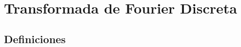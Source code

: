\documentclass[11pt,compress]{beamer}
\begin{document}
	

{
	\begin{frame}[plain]
		\titlepage
	\end{frame}
}


\section[DFT]{Transformada de Fourier Discreta}
\subsection{Definiciones}
\end{document}
